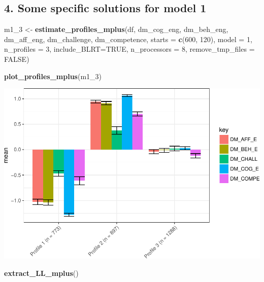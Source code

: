 \documentclass[]{msu-thesis}
\newenvironment{Shaded}{\begin{snugshade}}{\end{snugshade}}
\newcommand{\KeywordTok}[1]{\textcolor[rgb]{0.13,0.29,0.53}{\textbf{#1}}}
\newcommand{\DataTypeTok}[1]{\textcolor[rgb]{0.13,0.29,0.53}{#1}}
\newcommand{\DecValTok}[1]{\textcolor[rgb]{0.00,0.00,0.81}{#1}}
\newcommand{\StringTok}[1]{\textcolor[rgb]{0.31,0.60,0.02}{#1}}
\newcommand{\OtherTok}[1]{\textcolor[rgb]{0.56,0.35,0.01}{#1}}
\newcommand{\NormalTok}[1]{#1}
\theoremstyle{definition}
\theoremstyle{definition}
\theoremstyle{definition}
\theoremstyle{remark}
\begin{document}
\subsection{4. Some specific solutions for model
1}\label{some-specific-solutions-for-model-1}

\begin{Shaded}
\begin{Highlighting}[]
\NormalTok{m1_}\DecValTok{3}\NormalTok{ <-}\StringTok{ }\KeywordTok{estimate_profiles_mplus}\NormalTok{(df,  }
\NormalTok{                             dm_cog_eng, dm_beh_eng, dm_aff_eng, dm_challenge, dm_competence,}
                             \DataTypeTok{starts =} \KeywordTok{c}\NormalTok{(}\DecValTok{600}\NormalTok{, }\DecValTok{120}\NormalTok{),}
                             \DataTypeTok{model =} \DecValTok{1}\NormalTok{,}
                             \DataTypeTok{n_profiles =} \DecValTok{3}\NormalTok{,}
                             \DataTypeTok{include_BLRT=}\OtherTok{TRUE}\NormalTok{,}
                             \DataTypeTok{n_processors =} \DecValTok{8}\NormalTok{, }\DataTypeTok{remove_tmp_files =} \OtherTok{FALSE}\NormalTok{)}

\KeywordTok{plot_profiles_mplus}\NormalTok{(m1_}\DecValTok{3}\NormalTok{)}
\end{Highlighting}
\end{Shaded}

\includegraphics{rosenberg-dissertation_files/figure-latex/spec-solutions-model1-1.pdf}

\begin{Shaded}
\begin{Highlighting}[]
\KeywordTok{extract_LL_mplus}\NormalTok{()}
\end{Highlighting}
\end{Shaded}
\end{document}
